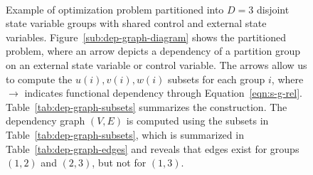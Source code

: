 \begin{figure}[t]
\centering
   \hfill
  \\
    \caption[Example of optimization problem partitioned into $D=3$ disjoint state variable groups with shared control and external state variables.]{Example of optimization problem partitioned into $D=3$ disjoint state variable groups with shared control and external state variables. Figure~\ref{sub:dep-graph-diagram} shows the partitioned problem, where an arrow depicts a dependency of a partition group on an external state variable or control variable. The arrows allow us to compute the $u\left(i\right), v\left(i\right), w\left(i\right)$ subsets for each group $i$, where $\rightarrow$ indicates functional dependency through Equation~\ref{eqn:s-g-rel}. Table~\ref{tab:dep-graph-subsets} summarizes the construction. The dependency graph $(V,E)$ is computed using the subsets in Table~\ref{tab:dep-graph-subsets}, which is summarized in Table~\ref{tab:dep-graph-edges} and reveals that edges exist for groups $\left(1,2\right)$ and $\left(2,3\right)$, but not for $\left(1,3\right)$.}
    \label{fig:dep-graph}
  \end{figure}



